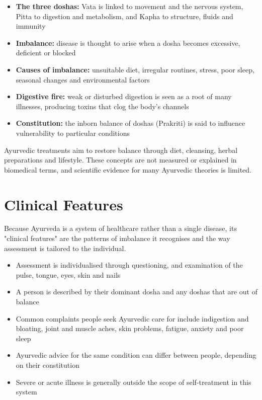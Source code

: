 \begin{itemize}
    \item \textbf{The three doshas:} Vata is linked to movement and the nervous system, Pitta to digestion and metabolism, and Kapha to structure, fluids and immunity
    \item \textbf{Imbalance:} disease is thought to arise when a dosha becomes excessive, deficient or blocked
    \item \textbf{Causes of imbalance:} unsuitable diet, irregular routines, stress, poor sleep, seasonal changes and environmental factors
    \item \textbf{Digestive fire:} weak or disturbed digestion is seen as a root of many illnesses, producing toxins that clog the body's channels
    \item \textbf{Constitution:} the inborn balance of doshas (Prakriti) is said to influence vulnerability to particular conditions
\end{itemize}

Ayurvedic treatments aim to restore balance through diet, cleansing, herbal preparations and lifestyle. These concepts are not measured or explained in biomedical terms, and scientific evidence for many Ayurvedic theories is limited.

\section*{Clinical Features}
Because Ayurveda is a system of healthcare rather than a single disease, its "clinical features" are the patterns of imbalance it recognises and the way assessment is tailored to the individual.

\begin{itemize}
    \item Assessment is individualised through questioning, and examination of the pulse, tongue, eyes, skin and nails
    \item A person is described by their dominant dosha and any doshas that are out of balance
    \item Common complaints people seek Ayurvedic care for include indigestion and bloating, joint and muscle aches, skin problems, fatigue, anxiety and poor sleep
    \item Ayurvedic advice for the same condition can differ between people, depending on their constitution
    \item Severe or acute illness is generally outside the scope of self-treatment in this system
\end{itemize}

